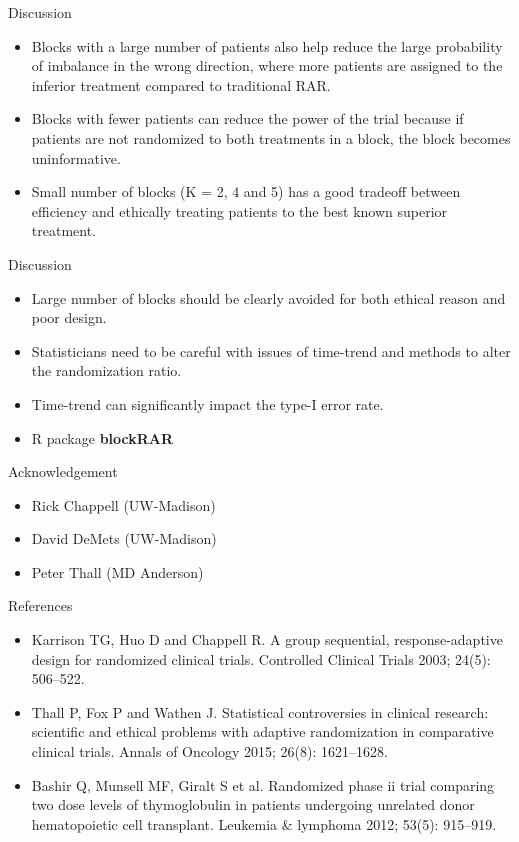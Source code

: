 \documentclass[12pt,t]{beamer}
\newcommand{\bi}{\begin{itemize}}
\newcommand{\ei}{\end{itemize}}
\begin{document}
\begin{frame}{Discussion}
\bi
\itemsep12pt
\item Blocks with a large number of patients also help reduce the large probability of imbalance in the wrong direction, where more patients are assigned to the inferior treatment compared to traditional RAR. 
\item Blocks with fewer patients can reduce the power of the trial because if patients are not randomized to both treatments in a block, the block becomes uninformative. 
\item Small number of blocks (K = 2, 4 and 5) has a good tradeoff between efficiency and ethically treating patients to the best known superior treatment.
\ei
\end{frame}

\begin{frame}{Discussion}
\bi
\itemsep12pt
\item Large number of blocks should be clearly avoided for both ethical reason and poor design.
\item Statisticians need to be careful with issues of time-trend and methods to alter the randomization ratio.
\item Time-trend can significantly impact the type-I error rate.
\item R package \textbf{blockRAR}
\ei
\end{frame}



\begin{frame}{Acknowledgement}
\bi
\itemsep6pt
\item Rick Chappell (UW-Madison)
\item David DeMets (UW-Madison)
\item Peter Thall (MD Anderson)
\ei
\end{frame}


\begin{frame}{References}
\bi
\itemsep12pt
\item Karrison TG, Huo D and Chappell R. A group sequential, response-adaptive design for randomized clinical trials. Controlled Clinical Trials 2003; 24(5): 506–522.

\item Thall P, Fox P and Wathen J. Statistical controversies in clinical research: scientific and ethical problems with adaptive randomization in comparative clinical trials. Annals of Oncology 2015; 26(8): 1621–1628.

\item Bashir Q, Munsell MF, Giralt S et al. Randomized phase ii trial comparing two dose levels of thymoglobulin in patients undergoing unrelated donor hematopoietic cell transplant. Leukemia \& lymphoma 2012; 53(5): 915–919.
\ei
\end{frame}
\end{document}
